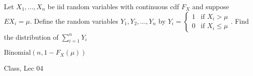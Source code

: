 \begin{samepage}
\begin{ex}
Let $X_1, ..., X_n$ be iid random variables with continuous cdf $F_X$ and suppose $EX_i = \mu$. Define the random variables $Y_1, Y_2, ..., Y_n$ by $Y_i = \begin{cases} 1 & \text{if } X_i > \mu \\ 0 & \text{if } X_i \leq \mu \end{cases}$.
Find the distribution of $\sum_{i=1}^n Y_i$
\end{ex}
\begin{ans}
$\text{Binomial}(n,1-F_X (\mu))$
\end{ans}
\begin{source}
Class, Lec 04
\end{source}
\end{samepage}
